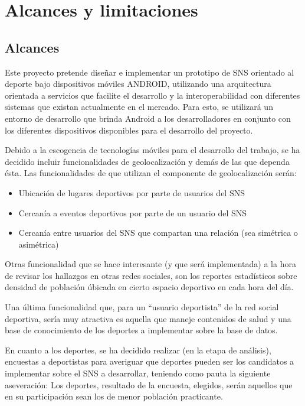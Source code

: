 \section{Alcances y limitaciones}

\subsection{Alcances}

Este proyecto pretende diseñar e implementar un prototipo de SNS orientado al deporte bajo dispositivos móviles ANDROID, utilizando una arquitectura orientada a servicios que facilite el desarrollo y la interoperabilidad con diferentes sistemas que existan actualmente en el mercado. Para esto, se utilizará un entorno de desarrollo que brinda Android a los desarrolladores en conjunto con los diferentes dispositivos disponibles para el desarrollo del proyecto.

Debido a la escogencia de tecnologías móviles para el desarrollo del trabajo, se ha decidido incluir funcionalidades de geolocalización y demás de las que dependa ésta. Las funcionalidades de que utilizan el componente de geolocalización serán:

\begin{itemize}
  \item Ubicación de lugares deportivos por parte de usuarios del SNS
  \item Cercanía a eventos deportivos por parte de un usuario del SNS
  \item Cercanía entre usuarios del SNS que compartan una relación (sea simétrica o asimétrica)
\end{itemize}

Otras funcionalidad que se hace interesante (y que será implementada) a la hora de revisar los hallazgos en otras redes sociales, son los reportes estadísticos sobre densidad de población úbicada en cierto espacio deportivo en cada hora del día.

Una última funcionalidad que, para un “usuario deportista” de la red social deportiva, sería muy atractiva es aquella que maneje contenidos de salud y una base de conocimiento de los deportes a implementar sobre la base de datos.

En cuanto a los deportes, se ha decidido realizar (en la etapa de análisis), encuestas a deportistas para averiguar que deportes pueden ser los candidatos a implementar sobre el SNS a desarrollar, teniendo como pauta la siguiente aseveración: Los deportes, resultado de la encuesta, elegidos, serán aquellos que en su participación sean los de menor población practicante.

